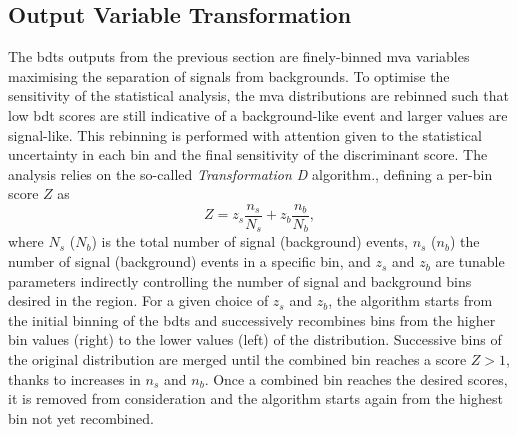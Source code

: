 \subsection{Output Variable Transformation}
The \glspl{bdt} outputs from the previous section are finely-binned \gls{mva} variables maximising the separation of signals from backgrounds. To optimise the sensitivity of the statistical analysis, the \gls{mva} distributions are rebinned such that low \gls{bdt} scores are still indicative of a background-like event and larger values are signal-like. This rebinning is performed with attention given to the statistical uncertainty in each bin and the final sensitivity of the discriminant score. The analysis relies on the so-called \textit{Transformation D} algorithm., defining a per-bin score $Z$ as
\begin{equation}
    Z = z_s \frac{n_s}{N_s} + z_b \frac{n_b}{N_b},
\end{equation} 
where $N_s$ ($N_b$) is the total number of signal (background) events, $n_s$ ($n_b$) the number of signal (background) events in a specific bin, and $z_s$ and $z_b$ are tunable parameters indirectly controlling the number of signal and background bins desired in the region. For a given choice of $z_s$ and $z_b$, the algorithm starts from the initial binning of the \glspl{bdt} and successively recombines bins from the higher bin values (right) to the lower values (left) of the distribution. Successive bins of the original distribution are merged until the combined bin reaches a score $Z > 1$, thanks to increases in $n_s$ and $n_b$. Once a combined bin reaches the desired scores, it is removed from consideration and the algorithm starts again from the highest bin not yet recombined.\\
